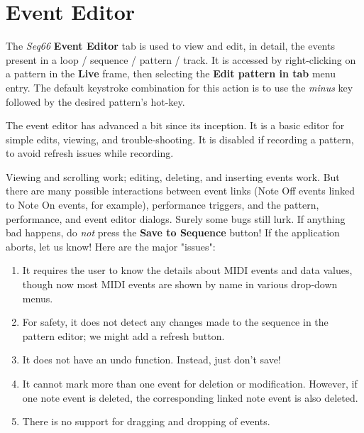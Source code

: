 %
%

\section{Event Editor}
\label{sec:event_editor}

   The \textsl{Seq66} \textbf{Event Editor} tab is used to view and edit,
   in detail, the events present in a loop / sequence / pattern / track.
   It is accessed by right-clicking on a pattern in the \textbf{Live} frame,
   then selecting the \textbf{Edit pattern in tab} menu entry.
   The default keystroke combination for this action is to use the
   \textsl{minus} key followed by the desired pattern's hot-key.

   The event editor has advanced a bit since its inception.
   It is a basic editor for simple edits, viewing, and trouble-shooting.
   It is disabled if recording a pattern, to avoid refresh issues while
   recording.

   Viewing and scrolling work;
   editing, deleting, and inserting events work.
   But there are many possible interactions between event links
   (Note Off events linked to Note On events, for example),
   performance triggers, and the pattern,
   performance, and event editor dialogs.
   Surely some bugs still lurk.
   If anything bad happens, do \textsl{not} press the
   \textbf{Save to Sequence} button!
   If the application aborts, let us know!
   Here are the major "issues":

   \begin{enumerate}
      \item It requires the user to know the details
         about MIDI events and data values, though now most MIDI
         events are shown by name in various drop-down menus.
      \item For safety, it does not detect any changes made to the sequence in
         the pattern editor; we might add a refresh button.
      \item It does not have an undo function. Instead, just don't save!
      \item It cannot mark more than one event for deletion or modification.
         However, if one note event is deleted, the corresponding linked note
         event is also deleted.
      \item There is no support for dragging and dropping of events.
   \end{enumerate}

